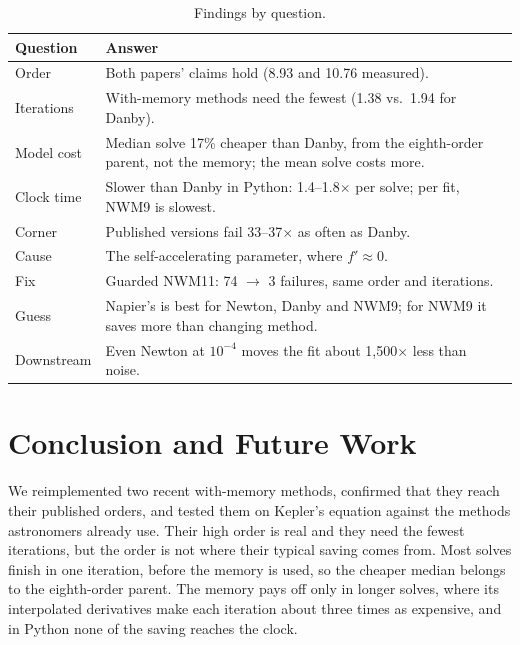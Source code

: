 \documentclass[sigconf,nonacm]{acmart}
\begin{document}
\begin{table}[h]
\centering\small
\caption{Findings by question.}
\label{tab:synth}
\begin{tabular}{@{}p{2.3cm}p{5.6cm}@{}}
\toprule
\textbf{Question} & \textbf{Answer} \\
\midrule
Order        & Both papers' claims hold (8.93 and 10.76 measured). \\
Iterations   & With-memory methods need the fewest (1.38 vs.\ 1.94 for Danby). \\
Model cost   & Median solve 17\% cheaper than Danby, from the eighth-order parent, not the memory; the mean solve costs more. \\
Clock time   & Slower than Danby in Python: 1.4--1.8$\times$ per solve; per fit, NWM9 is slowest. \\
Corner       & Published versions fail 33--37$\times$ as often as Danby. \\
Cause        & The self-accelerating parameter, where $f' \approx 0$. \\
Fix          & Guarded NWM11: 74 $\to$ 3 failures, same order and iterations. \\
Guess        & Napier's is best for Newton, Danby and NWM9; for NWM9 it saves more than changing method. \\
Downstream   & Even Newton at $10^{-4}$ moves the fit about 1{,}500$\times$ less than noise. \\
\bottomrule
\end{tabular}
\end{table}

\section{Conclusion and Future Work}

We reimplemented two recent with-memory methods, confirmed that they
reach their published orders, and tested them on Kepler's equation against
the methods astronomers already use. Their high order is real and they
need the fewest iterations, but the order is not where their typical
saving comes from. Most solves finish in one iteration, before the
memory is used, so the cheaper median belongs to the eighth-order parent.
The memory pays off only in longer solves, where its interpolated
derivatives make each iteration about three times as expensive, and in
Python none of the saving reaches the clock.
\end{document}
